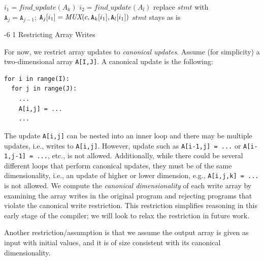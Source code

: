 \documentclass[sigconf, screen, natbib=false, dvipsnames, table]{acmart}
\makeatletter
\renewcommand{\subsubsection}{\@startsection{subsubsection}{3}{\z@}%
                        {-6\p@ \@plus -4\p@ \@minus -4\p@}%
                        {1\p@ \@plus 1\p@ \@minus 0\p@}%
                        {\normalfont\normalsize\bfseries\boldmath}}
\theoremstyle{definition}
\makeatother
\begin{document}
\begin{algorithmic}
\STATE $i_1 = \mathit{find\_update}(A_k)$ 
\STATE $i_2 = \mathit{find\_update}(A_l)$ 
 \STATE {}
\STATE replace $\mathit{stmt}$ with \\
\STATE $\texttt{A}_j = \texttt{A}_{j-1}$; $\texttt{A}_j[i_1] = \emph{MUX}(c, \texttt{A}_k[i_1], \texttt{A}_l[i_1])$
\ELSE
\STATE $\mathit{stmt}$ stays as is
\ENDIF
\ENDFOR
\end{algorithmic}


\subsubsection{Restricting Array Writes}

For now, we restrict array updates to \emph{canonical updates}. Assume (for simplicity) a two-dimensional array \texttt{A[I,J]}. A canonical update is the following:
\begin{verbatim}
for i in range(I):
  for j in range(J):
    ...
    A[i,j] = ...
    ...
\end{verbatim}

The update \texttt{A[i,j]} can be nested into an inner loop and there may be multiple updates, i.e., writes to \texttt{A[i,j]}. However, update such as \texttt{A[i-1,j] = ...} or \texttt{A[i-1,j-1] = ...}, etc., is not allowed. Additionally, while there could be several different loops that perform canonical updates, they must be of the same dimensionality, i.e., an update of higher or lower dimension, e.g., \texttt{A[i,j,k] = ...} is not allowed. We compute the \emph{canonical dimensionality} of each write array by examining the array writes in the original program and rejecting programs that violate the canonical write restriction. This restriction simplifies reasoning in this early stage of the compiler; we will look to relax the restriction in future work.

Another restriction/assumption is that we assume the output array is given as input with initial values, and it is of size consistent with its canonical dimensionality. 
\end{document}
